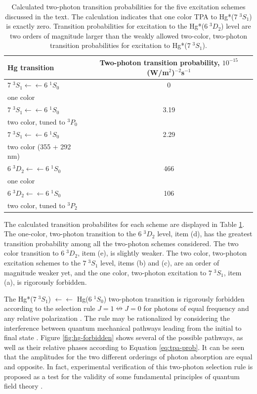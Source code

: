\begin{table}
  \caption{Calculated two-photon transition probabilities for the five
    excitation schemes discussed in the text.  The
    calculation indicates that one color TPA to Hg*($7 \; ^3S_1$)
    is exactly zero.  Transition probabilities for excitation to the
    Hg*($6 \; ^3D_2$) level are two orders of magnitude larger than the
    weakly allowed two-color, two-photon transition probabilities for excitation to
    Hg*($7 \; ^3S_1$).}
  \label{table:tpa-prob}
  \centering
  \vspace{1cm}
  \begin{tabular}{lc}
    \toprule
    Hg transition & Two-photon transition probability, $10^{-15}$ (W/m$^2$)$^{-2}$s$^{-1}$\\
    \midrule
    $7 \; ^3S_1 \leftarrow \leftarrow 6 \; ^1S_0$ & 0 \\
    one color\\
    $7 \; ^3S_1 \leftarrow \leftarrow 6 \; ^1S_0$ & 3.19 \\ 
    two color, tuned to $^3P_0$\\
    $7 \; ^3S_1 \leftarrow \leftarrow 6 \; ^1S_0$ & 2.29 \\
    two color (355 + 292 nm)\\
    $6 \; ^3D_2 \leftarrow \leftarrow 6 \; ^1S_0$ & 466 \\
    one color\\
    $6 \; ^3D_2 \leftarrow \leftarrow 6 \; ^1S_0$ & 106 \\
    two color, tuned to $^3P_2$\\
    \bottomrule
  \end{tabular}
\end{table}

The calculated transition probabilites for each scheme are displayed
in Table \ref{table:tpa-prob}.  The one-color, two-photon transition
to the $6 \; ^3D_2$ level, item (d), has the greatest transition
probability among all the two-photon schemes considered.  The two
color transition to $6 \; ^3D_2$, item (e), is slightly weaker.  The
two color, two-photon excitation schemes to the $7 \; ^3S_1$ level,
items (b) and (c), are an order of magnitude weaker yet, and the one
color, two-photon excitation to $7 \; ^3S_1$, item (a), is rigorously
forbidden.

The Hg*($7 \; ^3S_1$) $\leftarrow\leftarrow$ Hg($6 \; ^1S_0$)
two-photon transition is rigorously forbidden according to the
selection rule $J=1 \nleftrightarrow J=0$ for photons of equal
frequency and any relative polarization \cite{bonin84}.  The rule may
be rationalized by considering the interference between quantum
mechanical pathways leading from the initial to final state
\cite{bonin84, grynberg77}.  Figure \ref{fig:hg-forbidden} shows
several of the possible pathways, as well as their relative phases
according to Equation \ref{eq:tpa-prob}.  It can be seen that the
amplitudes for the two different orderings of photon absorption are
equal and opposite.  In fact, experimental verification of this
two-photon selection rule is proposed as a test for the validity of
some fundamental principles of quantum field theory \cite{hilborn02}.

